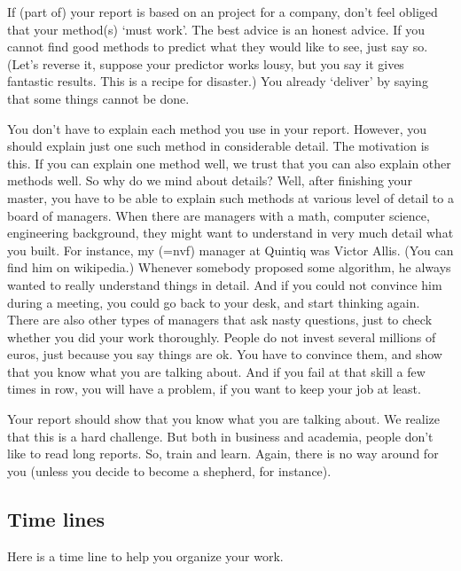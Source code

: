 \documentclass[report]{subfiles}
\begin{document}
If (part of) your report is based on an project for a company, don't feel obliged that your method(s) `must work'.
The best advice is an honest advice.
If you cannot find good methods to predict what they would like to see, just say so.
(Let's reverse it, suppose your predictor works lousy, but you say it gives fantastic results.
This is a recipe for disaster.)
You already `deliver' by saying that some things cannot be done.

You don't have to explain each method you use in your report.
However, you should explain just one such method in considerable detail.
The motivation is this.
If you can explain one method well, we trust that you can also explain other methods well.
So why do we mind about details?
Well, after finishing your master, you have to be able to explain such methods at various level of detail to a board of managers.
When there are managers with a math, computer science, engineering background, they might want to understand in very much detail what you built.
For instance, my (=nvf) manager at Quintiq was Victor Allis. (You can find him on wikipedia.)
Whenever somebody proposed some algorithm, he always wanted to really understand things in detail.
And if you could not convince him during a meeting, you could go back to your desk, and start thinking again.
There are also other types of managers that ask nasty questions,  just to check whether you did your work thoroughly.
People do not invest several millions of euros, just because you say things are ok.
You have to convince them, and show that you know what you are talking about.
And if you fail at that skill a few times in row, you will have a problem, if you want to keep your job at least.

Your report should show that you know what you are talking about.
We realize that this is a hard challenge.
But both in business and academia, people don't like to read long reports.
So, train and learn. Again, there is no way around for you (unless you decide to become a shepherd, for instance).

\subsection*{Time lines}
Here is a time line to help you organize your work.
\end{document}

